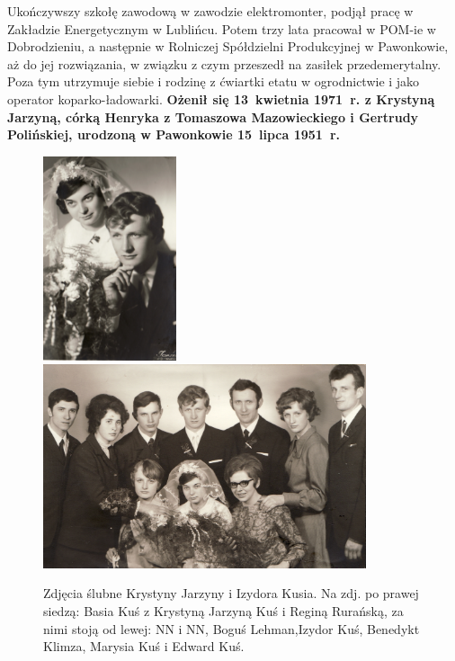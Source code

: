 Ukończywszy szkołę zawodową w zawodzie elektromonter, podjął pracę w Zakładzie Energetycznym w Lublińcu. Potem trzy lata pracował w POM-ie w Dobrodzieniu, a następnie w Rolniczej Spółdzielni Produkcyjnej w Pawonkowie, aż do jej rozwiązania, w związku z czym przeszedł na zasiłek przedemerytalny. Poza tym utrzymuje siebie i rodzinę z ćwiartki etatu w ogrodnictwie i jako operator koparko-ładowarki. \textbf{Ożenił się 13~kwietnia 1971~r. z Krystyną Jarzyną, córką Henryka z Tomaszowa Mazowieckiego i Gertrudy Polińskiej, urodzoną w Pawonkowie 15~lipca 1951~r.}
\begin{figure}[!h]
\begin{center}
\includegraphics[height=60mm]{photo/izydor_krystyna_kus_slub_1.jpg}
\includegraphics[height=60mm]{photo/izydor_krystyna_kus_slub_2.jpg}
\caption[Zdjęcia ślubne Krystyny Jarzyny i Izydora Kusia]{Zdjęcia ślubne Krystyny Jarzyny i Izydora Kusia. Na zdj. po prawej siedzą: Basia Kuś z Krystyną Jarzyną Kuś i Reginą Rurańską, za nimi stoją od lewej: NN i NN, Boguś Lehman,Izydor Kuś, Benedykt Klimza, Marysia Kuś i Edward Kuś.}
\label{rys:izydor_krystyna_kus_slub}
\end{center}
\end{figure}

